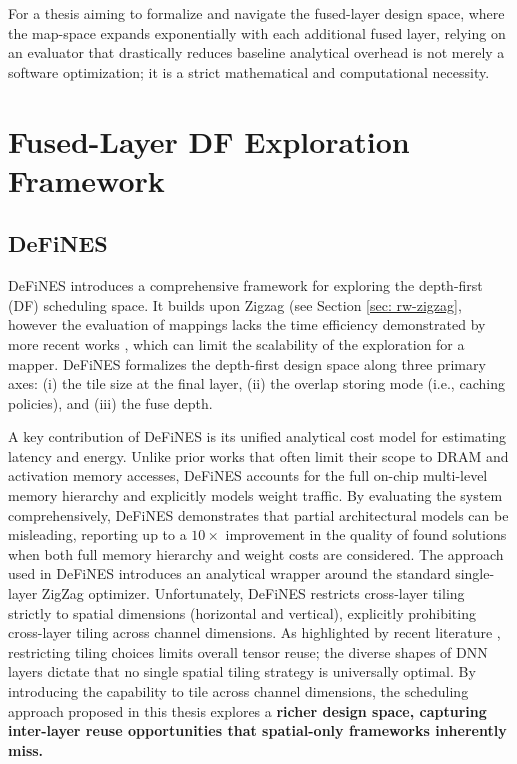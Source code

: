 For a thesis aiming to formalize and navigate the fused-layer design space, where the map-space expands exponentially with each additional fused layer, relying on an evaluator that drastically reduces baseline analytical overhead is not merely a software optimization; it is a strict mathematical and computational necessity. \newpage

\section{Fused-Layer DF Exploration Framework}

\subsection{DeFiNES}
DeFiNES \cite{mei2023defines} introduces a comprehensive framework for exploring the depth-first (DF) scheduling space. It builds upon Zigzag (see Section \ref{sec: rw-zigzag}, however the evaluation of mappings lacks the time efficiency demonstrated by more recent works \cite{Quickflow}, which can limit the scalability of the exploration for a mapper.
DeFiNES formalizes the depth-first design space along three primary axes: (i) the tile size at the final layer, (ii) the overlap storing mode (i.e., caching policies), and (iii) the fuse depth. 

A key contribution of DeFiNES is its unified analytical cost model for estimating latency and energy. Unlike prior works that often limit their scope to DRAM and activation memory accesses, DeFiNES accounts for the full on-chip multi-level memory hierarchy and explicitly models weight traffic. By evaluating the system comprehensively, DeFiNES demonstrates that partial architectural models can be misleading, reporting up to a $10\times$ improvement in the quality of found solutions when both full memory hierarchy and weight costs are considered. 
The approach used in DeFiNES introduces an analytical wrapper around the standard single-layer ZigZag optimizer. Unfortunately, DeFiNES restricts cross-layer tiling strictly to spatial dimensions (horizontal and vertical), explicitly prohibiting cross-layer tiling across channel dimensions. As highlighted by recent literature \cite{Looptree}, restricting tiling choices limits overall tensor reuse; the diverse shapes of DNN layers dictate that no single spatial tiling strategy is universally optimal. By introducing the capability to tile across channel dimensions, the scheduling approach proposed in this thesis explores a \textbf{richer design space, capturing inter-layer reuse opportunities that spatial-only frameworks inherently miss.} 


